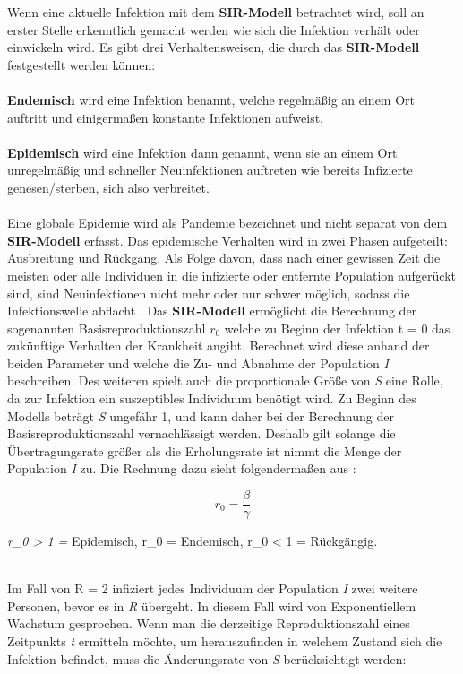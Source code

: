 \documentclass[12pt]{scrartcl} %
\begin{document}
Wenn eine aktuelle Infektion mit dem \textbf{SIR-Modell} betrachtet wird, soll an erster Stelle erkenntlich gemacht werden wie sich die Infektion verhält oder einwickeln wird. Es gibt drei Verhaltensweisen, die durch das \textbf{SIR-Modell} festgestellt werden können:\\
\\
\textbf{Endemisch} wird eine Infektion benannt, welche regelmäßig an einem Ort auftritt und einigermaßen konstante Infektionen aufweist.\\
\\
\textbf{Epidemisch} wird eine Infektion dann genannt, wenn sie an einem Ort unregelmäßig und schneller Neuinfektionen auftreten wie bereits Infizierte genesen/sterben, sich also verbreitet.\\
\\
Eine globale Epidemie wird als Pandemie bezeichnet und nicht separat von dem \textbf{SIR-Modell} erfasst. Das epidemische Verhalten wird in zwei Phasen aufgeteilt: Ausbreitung und Rückgang. Als Folge davon, dass nach einer gewissen Zeit die meisten oder alle Individuen in die infizierte oder entfernte Population aufgerückt sind, sind Neuinfektionen nicht mehr oder nur schwer möglich, sodass die Infektionswelle abflacht \cite{3,5}. Das \textbf{SIR-Modell} ermöglicht die Berechnung der sogenannten Basisreproduktionszahl  $r_{0}$
welche zu Beginn der Infektion t = 0 das zukünftige Verhalten der Krankheit angibt. Berechnet wird diese anhand der beiden Parameter \textbeta\space und \textgamma\space welche die Zu- und Abnahme der Population \textit{I} beschreiben. Des weiteren spielt auch die proportionale Größe von \textit{S} eine Rolle, da zur Infektion ein suszeptibles Individuum benötigt wird. Zu Beginn des Modells beträgt \textit{S} ungefähr 1, und kann daher bei der Berechnung der Basisreproduktionszahl vernachlässigt werden. Deshalb gilt solange die Übertragungsrate \textbeta\space größer als die Erholungsrate \textgamma\space ist nimmt die Menge der Population \textit{I} zu. Die Rechnung dazu sieht folgendermaßen aus \cite{6,3}:

$$ r_{0} = \frac{\beta}{\gamma} $$

\begin{center}
\textit{r_{0} > 1 =} \textnormal{Epidemisch}, r_{0}  = \textnormal{Endemisch}, r_{0} < 1 = \textnormal{Rückgängig.}
\end{center}\\
Im Fall von R = 2 infiziert jedes Individuum der Population \textit{I} zwei weitere Personen, bevor es in \textit{R} übergeht. In diesem Fall wird von Exponentiellem Wachstum gesprochen.
Wenn man die derzeitige Reproduktionszahl eines Zeitpunkts \textit{t} ermitteln möchte, um herauszufinden in welchem Zustand sich die Infektion befindet, muss die Änderungsrate von \textit{S} berücksichtigt werden:
\end{document}
